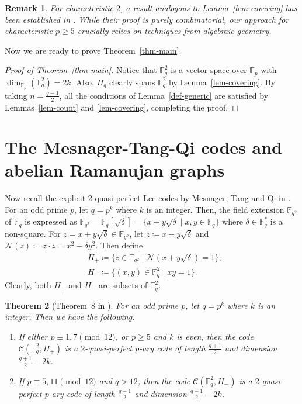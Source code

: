 \documentclass{amsart}
\newtheorem{theorem}{Theorem}%
\newtheorem{remark}[theorem]{Remark}
\numberwithin{equation}{section}
\newcommand{\F}{\mathbb{F}}
\begin{document}
\begin{remark}
For characteristic $2$, a result analogous to Lemma~\ref{lem-covering} has been established in \cite[Theorem~10.2.3]{CHLL1997}. While their proof is purely combinatorial, our approach for characteristic $p \geq 5$ crucially relies on techniques from algebraic geometry.
\end{remark}

Now we are ready to prove Theorem~\ref{thm-main}.

\begin{proof}[Proof of Theorem~\ref{thm-main}]
Notice that $\F_q^2$ is a vector space over $\F_p$ with $\dim_{\F_p}(\F_q^2)=2k$. 
Also, $H_q$ clearly spans $\F_q^2$ by Lemma~\ref{lem-covering}.
By taking $n=\frac{q-1}{2}$,  
all the conditions of Lemma~\ref{def-generic} are satisfied by Lemmas~\ref{lem-count} and \ref{lem-covering}, 
completing the proof.   
\end{proof}


\section{The Mesnager-Tang-Qi codes and abelian Ramanujan graphs}
\label{sect-MTQ}
Now recall the explicit $2$-quasi-perfect Lee codes by Mesnager, Tang and Qi in \cite{MTQ2018}. 
For an odd prime $p$, let $q=p^k$ where $k$ is an integer.
Then, the field extension $\F_{q^2}$ of $\F_q$ is expressed as  $\F_{q^2}=\F_q[\sqrt{\delta}]=\{x+y\sqrt{\delta} \mid x, y \in \F_q\}$ where $\delta \in \F_q^*$ is a non-square.
For $z=x+y\sqrt{\delta} \in \F_{q^2}$, let $\overline{z}\coloneq x-y\sqrt{\delta}$ and
$\mathcal{N}(z)\coloneq z\cdot \overline{z}=x^2-\delta y^2$.
Then define 
\begin{align*}
    &H_{+}\coloneq \{z \in \F_{q^2} \mid \mathcal{N}(x+y\sqrt\delta)=1 \},\\
    &H_{-}\coloneq \{(x,y) \in \F_{q}^2 \mid xy=1\}.
\end{align*}
Clearly, both $H_{+}$ and $H_{-}$ are subsets of $\F_q^2$.

\begin{theorem}[Theorem~8 in \cite{MTQ2018}]
\label{thm-MTQ2018}
For an odd prime $p$, let $q=p^k$ where $k$ is an integer.
Then we have the following.
\begin{enumerate}
    \item[$(1)$] If either $p\equiv 1, 7 \pmod{12}$, or $p\geq 5$ and $k$ is even, then the code $\mathcal{C}(\F_q^2, H_{+})$ is a $2$-quasi-perfect $p$-ary code of length $\frac{q+1}{2}$ and dimension $\frac{q+1}{2}-2k$.

     \item[$(2)$] If $p\equiv 5, 11 \pmod{12}$ and $q>12$, then the code $\mathcal{C}(\F_q^2, H_{-})$ is a $2$-quasi-perfect $p$-ary code of length $\frac{q-1}{2}$ and dimension $\frac{q-1}{2}-2k$.
\end{enumerate}

\end{theorem}
\end{document}
